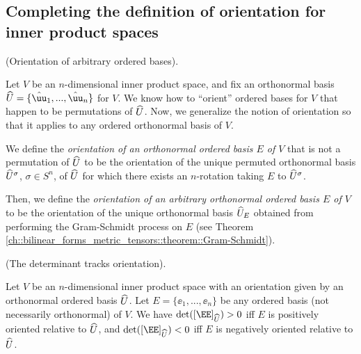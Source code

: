 \subsection*{Completing the definition of orientation for inner product spaces}

\begin{defn}
    (Orientation of arbitrary ordered bases).
    
    Let $V$ be an $n$-dimensional inner product space, and fix an orthonormal basis $\hU = \{\huu_1, ..., \huu_n\}$ for $V$. We know how to ``orient'' ordered bases for $V$ that happen to be permutations of $\widehat{U}$. Now, we generalize the notion of orientation so that it applies to any ordered orthonormal basis of $V$.
    
    We define the \textit{orientation of an orthonormal ordered basis $E$ of $V$} that is not a permutation of $\widehat{U}$ to be the orientation of the unique permuted orthonormal basis $\widehat{U}^\sigma$, $\sigma \in S^n$, of $\widehat{U}$ for which there exists an $n$-rotation taking $E$ to $\widehat{U}^\sigma$.
    
    Then, we define the \textit{orientation of an arbitrary orthonormal ordered basis $E$ of $V$} to be the orientation of the unique orthonormal basis $\widehat{U}_E$ obtained from performing the Gram-Schmidt process on $E$ (see Theorem \ref{ch::bilinear_forms_metric_tensors::theorem::Gram-Schmidt}).
\end{defn}

\begin{theorem}
\label{ch::exterior_pwrs::thm::det_tracks_orientation}
    (The determinant tracks orientation). 
    
    Let $V$ be an $n$-dimensional inner product space with an orientation given by an orthonormal ordered basis $\widehat{U}$. Let $E = \{\ee_1, ..., \ee_n\}$ be any ordered basis (not necessarily orthonormal) of $V$. We have $\det([\EE]_{\hU}) > 0$ iff $E$ is positively oriented relative to $\widehat{U}$, and $\det([\EE]_{\hU}) < 0$ iff $E$ is negatively oriented relative to $\widehat{U}$.
\end{theorem}

